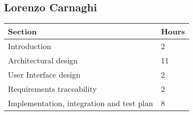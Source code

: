 {\color{secblue}\subsection{Lorenzo Carnaghi}}
\begin{table}[H]
\begin{tabular}{ll}
\hline
\multicolumn{1}{|l|}{Section} & \multicolumn{1}{l|}{Hours} \\ \hline
\multicolumn{1}{|l|}{Introduction} & \multicolumn{1}{l|}{2} \\ \hline
\multicolumn{1}{|l|}{Architectural design}            & \multicolumn{1}{l|}{11}     \\ \hline
\multicolumn{1}{|l|}{User Interface design}     & \multicolumn{1}{l|}{2}     \\ \hline
\multicolumn{1}{|l|}{Requirements traceability}   & \multicolumn{1}{l|}{2}     \\ \hline
\multicolumn{1}{|l|}{Implementation, integration and test plan}   & \multicolumn{1}{l|}{8}       \\ \hline         
\end{tabular}
\end{table}